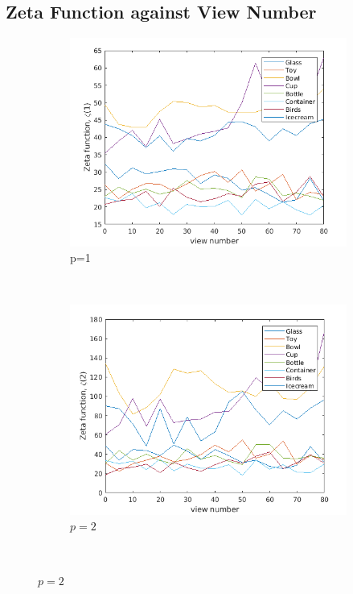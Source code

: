 \documentclass[10pt,a4paper]{article}
\theoremstyle{plain}
\theoremstyle{definition}
\begin{document}
\subsection{Zeta Function against View Number}
\begin{figure}[H]
	\centering
	\begin{subfigure}[b]{0.5\textwidth}
		\includegraphics[width= \textwidth]{images/zeta-viewnump1.png}
		\caption{p=1}
		\label{}
	\end{subfigure}~
	\begin{subfigure}[b]{0.5\textwidth}
		\includegraphics[width= \textwidth]{images/zeta-viewnump2.png}
		\caption{$p=2$}
		\label{}
	\end{subfigure}\\

\end{figure}
\end{document}

